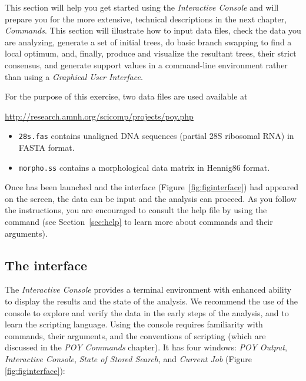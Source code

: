 {This section will help you get started using the \poy \emph{Interactive Console} and will prepare you for the
more extensive, technical descriptions in the next chapter, \emph{\poy Commands}. %
This section will illustrate how to input data files, check the data you are analyzing, generate a set of initial trees, do basic branch 
swapping to find a local optimum, and, finally, produce and visualize the resultant trees, their strict consensus, and generate support 
values in a command-line environment rather than using a \emph{Graphical User Interface}. 

For the purpose of this exercise, two data files are used available at \\
\begin{center}
\url{http://research.amnh.org/scicomp/projects/poy.php}
\end{center}

\begin{itemize}
	\item {\texttt{28s.fas} contains unaligned DNA sequences (partial 28S ribosomal RNA) 
	in FASTA format.~\cite{pearson1988}}
	\item {\texttt{morpho.ss} contains a morphological data matrix in Hennig86 format.~\cite{farris1988}}
\end{itemize}

Once \poy has been launched and the interface (Figure~\ref{fig:figinterface}) had appeared on the screen, the data can 
be input and the analysis can proceed. As you follow the instructions, you are encouraged to consult the help file by using 
the command  (see Section~\ref{sec:help} to learn more about \poy commands and their arguments).

\subsection{The interface}

The \emph{Interactive Console} provides a terminal environment with enhanced ability to display the results and the state 
of the analysis. We recommend the use of the console to explore and verify the data in the early steps of the analysis, and 
to learn the scripting language. Using the console requires familiarity with \poy commands, their arguments, and the 
conventions of \poy scripting (which are discussed in the \emph{POY Commands} chapter). It has four windows: 
\emph{POY Output}, \emph{Interactive Console}, \emph{State of Stored Search}, and \emph{Current Job} (Figure \ref{fig:figinterface}):

}
